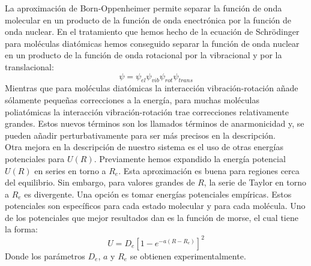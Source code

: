 \documentclass[a4paper]{article}
\begin{document}
La aproximación de Born-Oppenheimer permite separar la función de onda molecular en un producto de la función de onda enectrónica por la función de onda nuclear. En el tratamiento que hemos hecho de la ecuación de Schrödinger para moléculas diatómicas hemos conseguido separar la función de onda nuclear en un producto de la función de onda rotacional por la vibracional y por la translacional:
\begin{equation}
\psi=\psi_{el}\psi_{vib}\psi_{rot}\psi_{trans}
\end{equation}
Mientras que para moléculas diatómicas la interacción vibración-rotación añade sólamente pequeñas correcciones a la energía, para muchas moléculas poliatómicas la interacción vibración-rotación trae correcciones relativamente grandes. Estos nuevos términos son los llamados términos de anarmonicidad y, se pueden añadir perturbativamente para ser más precisos en la descripción.\\

Otra mejora en la descripción de nuestro sistema es el uso de otras energías potenciales para $U(R)$. Previamente hemos expandido la energía potencial $U(R)$ en series en torno a $R_e$. Esta aproximación es buena para regiones cerca del equilibrio. Sin embargo, para valores grandes de $R$, la serie de Taylor en torno a $R_e$ es divergente. Una opción es tomar energías potenciales empíricas. Estos potenciales son específicos para cada estado molecular y para cada molécula. Uno de los potenciales que mejor resultados dan es la función de morse, el cual tiene la forma:
\begin{equation}
U=D_e \left[ 1- e^{-a(R-R_e)} \right]^2
\end{equation}
Donde los parámetros $D_e$, $a$ y $R_e$ se obtienen experimentalmente.\\
\end{document}
